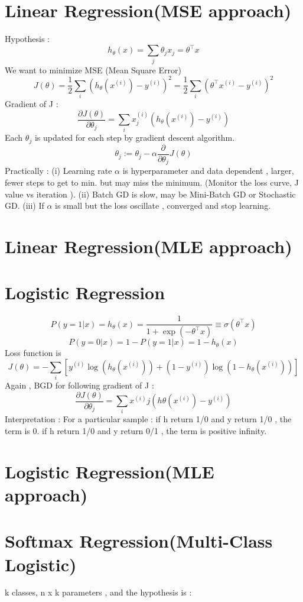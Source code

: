 \documentclass{article}
\begin{document}
\section{Linear Regression(MSE approach) }
Hypothesis : 
\[
h_\theta(x) = \sum_j \theta_j x_j = \theta^\top x
\]
We want to minimize MSE (Mean Square Error) 
\[
J(\theta) = \frac{1}{2} \sum_i \left( h_\theta(x^{(i)}) - y^{(i)} \right)^2 = \frac{1}{2} \sum_i \left( \theta^\top x^{(i)} - y^{(i)} \right)^2
\]
Gradient of J : 
\[
\frac{\partial J(\theta)}{\partial \theta_j} = \sum_i x_j^{(i)} \left( h_\theta(x^{(i)}) - y^{(i)} \right)
\]
Each \(\theta_j\) is updated for each step by gradient descent algorithm. 
\[
\theta_j := \theta_j - \alpha \frac{\partial}{\partial \theta_j} J(\theta)
\]
Practically : 
\newline
(i) Learning rate \(\alpha\) is hyperparameter and data dependent , larger, fewer steps to get to min. but may miss the minimum. (Monitor the loss curve, J value vs iteration ). 
\newline
(ii) Batch GD is slow, may be Mini-Batch GD or Stochastic GD.
\newline
(iii) If \(\alpha\) is small but the loss oscillate , converged and stop learning.


\section{Linear Regression(MLE approach) }
\section{Logistic Regression}
\[P(y=1|x) = h_\theta(x) = \frac{1}{1 + \exp(-\theta^\top x)} \equiv \sigma(\theta^\top x)\]
\[P(y=0|x) = 1 - P(y=1|x) = 1 - h_\theta(x)\]
Loss function is 
\[J(\theta) = -\sum_i \left[ y^{(i)} \log(h_\theta(x^{(i)})) + (1 - y^{(i)}) \log(1 - h_\theta(x^{(i)})) \right]\]
Again , BGD for following gradient of J : 
\[\frac{\partial J(\theta)}{\partial \theta_j} = \sum_i x^{(i)}j \left( h\theta(x^{(i)}) - y^{(i)} \right)\]
Interpretation : For a particular sample : if h return 1/0 and y return 1/0 , the term is 0. if  h return 1/0 and y return 0/1 , the term is positive infinity. 
\section{Logistic Regression(MLE approach)}
\section{Softmax Regression(Multi-Class Logistic)}
k classes, n x k parameters , and the hypothesis is :
\end{document}
